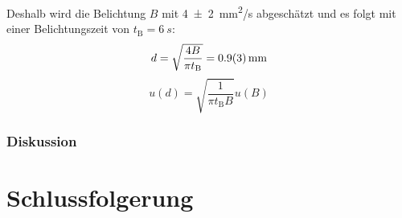 \documentclass[
	a4paper,
	12pt,
	pagesize,
	ngerman
]{scrartcl}
\begin{document}
	Deshalb wird die Belichtung $B$ mit \SI{4+-2}{mm^2/s} abgeschätzt und es folgt mit einer Belichtungszeit von $t_\text{B}=\SI{6}{s}$:
	\begin{equation}
		d = \sqrt{\frac{4B}{\pi t_\text{B}}} = \SI{0,9+-0,3}{mm}
	\end{equation}
	\begin{equation}
		u(d) = \sqrt{\frac{1}{\pi t_\text{B}B}}u(B)
	\end{equation}

	
	\subsubsection{Diskussion}
	
	\section{Schlussfolgerung}
	
	\printbibliography
\end{document}

